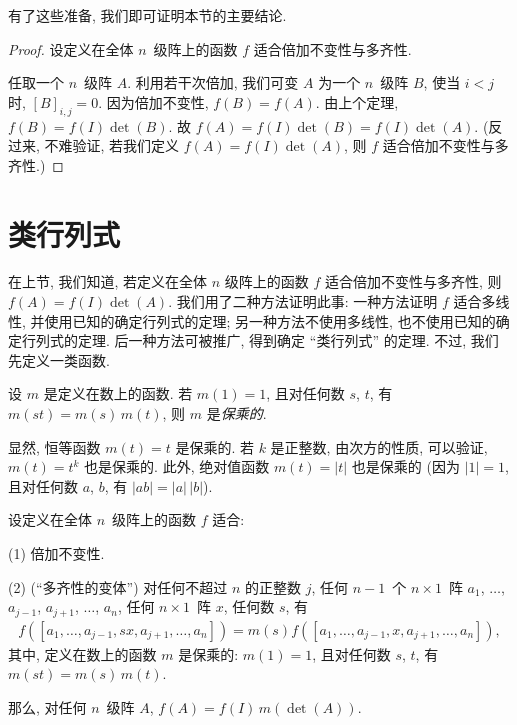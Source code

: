 有了这些准备, 我们即可证明本节的主要结论.

\begin{proof}
    设定义在全体 \(n\)~级阵上的函数 \(f\)
    适合倍加不变性与多齐性.

    任取一个 \(n\)~级阵 \(A\).
    利用若干次倍加,
    我们可变 \(A\) 为一个 \(n\)~级阵 \(B\),
    使当 \(i < j\) 时, \([B]_{i,j} = 0\).
    因为倍加不变性, \(f(B) = f(A)\).
    由上个定理, \(f(B) = f(I) \det {(B)}\).
    故 \(f(A) = f(I) \det {(B)} = f(I) \det {(A)}\).
    (反过来, 不难验证, 若我们定义
    \(f(A) = f(I) \det {(A)}\),
    则 \(f\) 适合倍加不变性与多齐性.)
\end{proof}

\section{类行列式}

在上节, 我们知道, 若定义在全体 \(n\) 级阵上的函数 \(f\)
适合倍加不变性与多齐性,
则 \(f(A) = f(I) \det {(A)}\).
我们用了二种方法证明此事:
一种方法证明 \(f\) 适合多线性, 并使用已知的确定行列式的定理;
另一种方法不使用多线性, 也不使用已知的确定行列式的定理.
后一种方法可被推广, 得到确定 ``类行列式'' 的定理.
不过, 我们先定义一类函数.

\begin{definition}
    设 \(m\) 是定义在数上的函数.
    若 \(m(1) = 1\),
    且对任何数 \(s\), \(t\), 有 \(m(st) = m(s)\, m(t)\),
    则 \(m\) 是\emph{保乘的}.
\end{definition}

显然, 恒等函数 \(m(t) = t\) 是保乘的.
若 \(k\) 是正整数,
由次方的性质, 可以验证,
\(m(t) = t^k\) 也是保乘的.
此外, 绝对值函数 \(m(t) = |t|\) 也是保乘的
(因为 \(|1| = 1\),
且对任何数 \(a\), \(b\), 有 \(|ab| = |a|\,|b|\)).

\begin{theorem}
    设定义在全体 \(n\)~级阵上的函数 \(f\)
    适合:

    (1)
    倍加不变性.

    (2)
    (``多齐性的变体'')
    对任何不超过 \(n\) 的正整数 \(j\),
    任何 \(n-1\)~个 \(n \times 1\)~阵
    \(a_1\), \(\dots\), \(a_{j-1}\),
    \(a_{j+1}\), \(\dots\), \(a_n\),
    任何 \(n \times 1\)~阵 \(x\),
    任何数 \(s\),
    有
    \begin{align*}
        f {([a_1, \dots, a_{j-1}, sx, a_{j+1}, \dots, a_n])}
        =
        m(s)
        f {([a_1, \dots, a_{j-1}, x, a_{j+1}, \dots, a_n])},
    \end{align*}
    其中, 定义在数上的函数 \(m\) 是保乘的:
    \(m(1) = 1\),
    且对任何数 \(s\), \(t\), 有 \(m(st) = m(s)\, m(t)\).

    那么, 对任何 \(n\)~级阵 \(A\),
    \(f(A) = f(I)\, m(\det {(A)})\).
\end{theorem}

